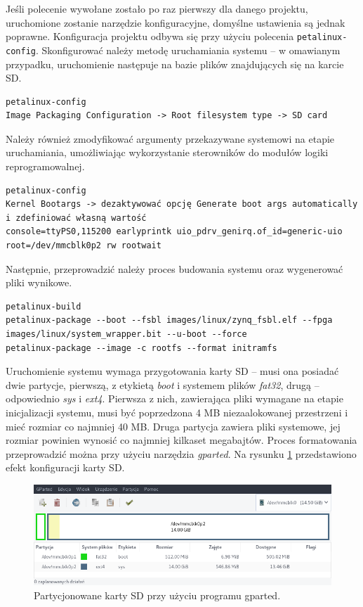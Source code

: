 Jeśli polecenie wywołane zostało po raz pierwszy dla danego projektu, uruchomione zostanie narzędzie konfiguracyjne, domyślne ustawienia są jednak poprawne.
Konfiguracja projektu odbywa się przy użyciu polecenia \texttt{petalinux-config}.
Skonfigurować należy metodę uruchamiania systemu -- w omawianym przypadku, uruchomienie następuje na bazie plików znajdujących się na karcie SD.
\begin{lstlisting}[breaklines=true]
petalinux-config
Image Packaging Configuration -> Root filesystem type -> SD card
\end{lstlisting}

Należy również zmodyfikować argumenty przekazywane systemowi na etapie uruchamiania, umożliwiając wykorzystanie sterowników do modułów logiki reprogramowalnej.

\begin{lstlisting}[breaklines=true]
petalinux-config
Kernel Bootargs -> dezaktywować opcję Generate boot args automatically i zdefiniować własną wartość
console=ttyPS0,115200 earlyprintk uio_pdrv_genirq.of_id=generic-uio root=/dev/mmcblk0p2 rw rootwait 
\end{lstlisting}
Następnie, przeprowadzić należy proces budowania systemu oraz wygenerować pliki wynikowe.

\begin{lstlisting}[breaklines=true]
petalinux-build
petalinux-package --boot --fsbl images/linux/zynq_fsbl.elf --fpga images/linux/system_wrapper.bit --u-boot --force
petalinux-package --image -c rootfs --format initramfs
\end{lstlisting}

Uruchomienie systemu wymaga przygotowania karty SD -- musi ona posiadać dwie partycje, pierwszą, z etykietą \emph{boot} i systemem plików \emph{fat32}, drugą -- odpowiednio \emph{sys} i \emph{ext4}. 
Pierwsza z nich, zawierająca pliki wymagane na etapie inicjalizacji systemu, musi być poprzedzona 4 MB niezaalokowanej przestrzeni i mieć rozmiar co najmniej 40 MB. 
Druga partycja zawiera pliki systemowe, jej rozmiar powinien wynosić co najmniej kilkaset megabajtów. 
Proces formatowania przeprowadzić można przy użyciu narzędzia \emph{gparted}. Na rysunku \ref{fig:gparted-screen} przedstawiono efekt konfiguracji karty SD.

\begin{figure}[H]
	\centering
	\includegraphics[width=12cm]{img/gparted-screen.png}
	\caption{Partycjonowane karty SD przy użyciu programu gparted.}
	\label{fig:gparted-screen}
\end{figure}

